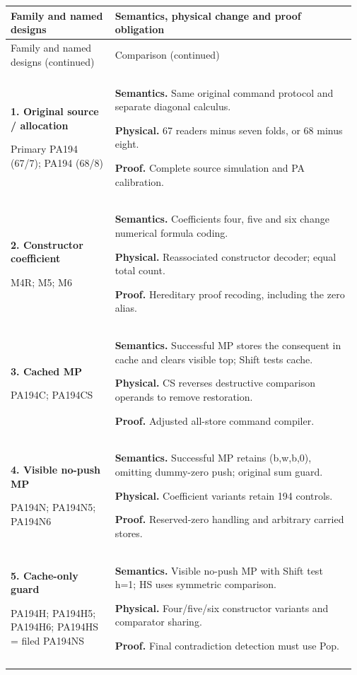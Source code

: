 \small
\setlength{\tabcolsep}{5pt}
\begin{longtable}{@{}>{\raggedright\arraybackslash}p{0.295\linewidth}>{\raggedright\arraybackslash}p{0.675\linewidth}@{}}
\toprule Family and named designs & Semantics, physical change and proof obligation\\\midrule
\endfirsthead
\toprule Family and named designs (continued) & Comparison (continued)\\\midrule
\endhead
\midrule\multicolumn{2}{r}{\emph{Continued on next page}}\\\endfoot
\bottomrule\endlastfoot
\textbf{1. Original source / allocation}\par Primary PA194 (67/7); PA194 (68/8) & \textbf{Semantics.} Same original command protocol and separate diagonal calculus.\par\textbf{Physical.} 67 readers minus seven folds, or 68 minus eight.\par\textbf{Proof.} Complete source simulation and PA calibration.\\\addlinespace[6pt]
\textbf{2. Constructor coefficient}\par M4R; M5; M6 & \textbf{Semantics.} Coefficients four, five and six change numerical formula coding.\par\textbf{Physical.} Reassociated constructor decoder; equal total count.\par\textbf{Proof.} Hereditary proof recoding, including the zero alias.\\\addlinespace[6pt]
\textbf{3. Cached MP}\par PA194C; PA194CS & \textbf{Semantics.} Successful MP stores the consequent in cache and clears visible top; Shift tests cache.\par\textbf{Physical.} CS reverses destructive comparison operands to remove restoration.\par\textbf{Proof.} Adjusted all-store command compiler.\\\addlinespace[6pt]
\textbf{4. Visible no-push MP}\par PA194N; PA194N5; PA194N6 & \textbf{Semantics.} Successful MP retains (b,w,b,0), omitting dummy-zero push; original sum guard.\par\textbf{Physical.} Coefficient variants retain 194 controls.\par\textbf{Proof.} Reserved-zero handling and arbitrary carried stores.\\\addlinespace[6pt]
\textbf{5. Cache-only guard}\par PA194H; PA194H5; PA194H6; PA194HS = filed PA194NS & \textbf{Semantics.} Visible no-push MP with Shift test h=1; HS uses symmetric comparison.\par\textbf{Physical.} Four/five/six constructor variants and comparator sharing.\par\textbf{Proof.} Final contradiction detection must use Pop.\\\addlinespace[6pt]

\end{longtable}
